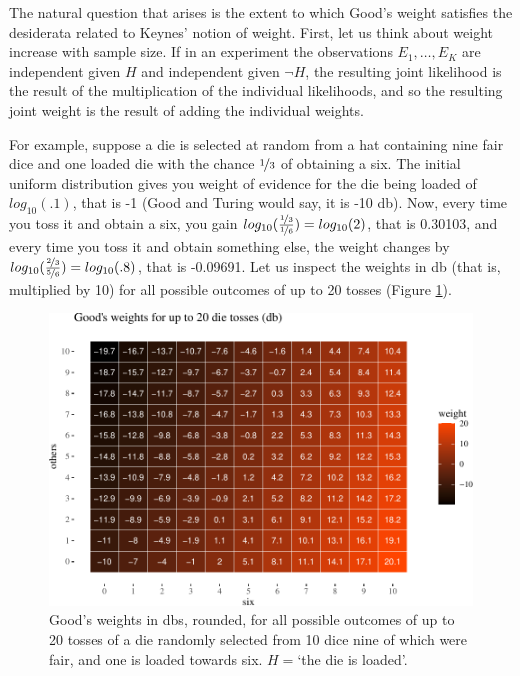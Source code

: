 \documentclass[
  10pt,
  dvipsnames,enabledeprecatedfontcommands]{scrartcl}
\begin{document}
The natural question that arises is the extent to which Good's weight
satisfies the desiderata related to Keynes' notion of weight. First, let
us think about weight increase with sample size. If in an experiment the
observations \(E_1, \dots, E_K\) are independent given \(H\) and
independent given \(\neg H\), the resulting joint likelihood is the
result of the multiplication of the individual likelihoods, and so the
resulting joint weight is the result of adding the individual weights.

For example, suppose a die is selected at random from a hat containing
nine fair dice and one loaded die with the chance \(\nicefrac{1}{3}\) of
obtaining a six. The initial uniform distribution gives you weight of
evidence for the die being loaded of \(log_{10}(.1)\), that is -1 (Good
and Turing would say, it is -10 db). Now, every time you toss it and
obtain a six, you gain
\(log_{10}(\frac{\nicefrac{1}{3}}{\nicefrac{1}{6}})= log_{10}(2)\), that
is 0.30103, and every time you toss it and obtain something else, the
weight changes by
\(log_{10}(\frac{\nicefrac{2}{3}}{\nicefrac{5}{6}})= log_{10}(.8)\),
that is -0.09691. Let us inspect the weights in db (that is, multiplied
by 10) for all possible outcomes of up to 20 tosses (Figure
\ref{fig:goodWeight}).

\begin{figure}

\begin{center}\includegraphics[width=1\linewidth]{imprecision_weight_files/figure-latex/goodWEights-1} \end{center}
\caption{Good's weights in dbs, rounded, for all possible outcomes of up to 20 tosses of a die randomly selected from 10 dice nine of which were fair, and one is  loaded towards six. $H=$`the die is loaded'.}
\label{fig:goodWeight}
\end{figure}
\end{document}
